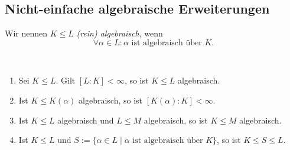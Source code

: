 \subsection{Nicht-einfache algebraische Erweiterungen}

\begin{definition}
    Wir nennen $K \leq L$ \emph{(rein) algebraisch}, wenn
    $$ \forall \alpha \in L: \alpha \text{ ist algebraisch über } K. $$
\end{definition}

\begin{proposition}{\ }
    \begin{enumerate}
        \item Sei $K \leq L$. Gilt $[L:K] < \infty$, so ist $K \leq L$ algebraisch.
        \item Ist $K \leq K(\alpha)$ algebraisch, so ist $[K(\alpha) : K] < \infty$.
        \item Ist $K \leq L$ algebraisch und $L \leq M$ algebraisch, so ist $K \leq M$ algebraisch.
        \item Ist $K \leq L$ und $S := \{ \alpha \in L \mid \alpha \text{ ist algebraisch über } K \}$, so ist $K \leq S \leq L$.
    \end{enumerate}
\end{proposition}

